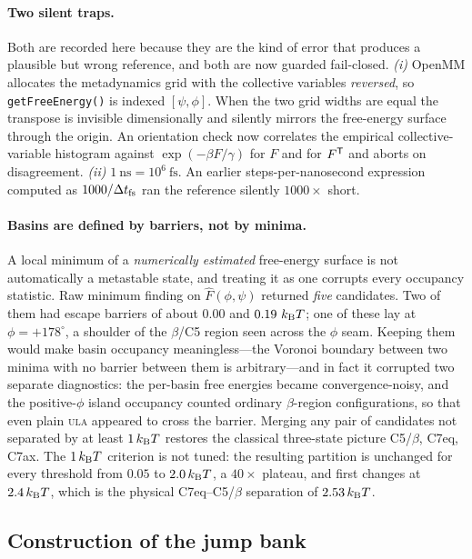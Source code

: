 \documentclass[11pt]{article}
\begin{document}
\paragraph{Two silent traps.}
Both are recorded here because they are the kind of error that produces a
plausible but wrong reference, and both are now guarded fail-closed.
\emph{(i)} OpenMM allocates the metadynamics grid with the collective variables
\emph{reversed}, so \texttt{getFreeEnergy()} is indexed $[\psi,\phi]$.  When the
two grid widths are equal the transpose is invisible dimensionally and silently
mirrors the free-energy surface through the origin.  An orientation check now
correlates the empirical collective-variable histogram against
$\exp(-\beta F/\gamma)$ for $F$ and for $F^{\sf T}$ and aborts on
disagreement.  \emph{(ii)} $1\ \mathrm{ns}=10^{6}\ \mathrm{fs}$.  An earlier
steps-per-nanosecond expression computed as $1000/\Delta t_{\rm fs}$ ran the
reference silently $1000\times$ short.

\paragraph{Basins are defined by barriers, not by minima.}
A local minimum of a \emph{numerically estimated} free-energy surface is not
automatically a metastable state, and treating it as one corrupts every
occupancy statistic.  Raw minimum finding on $\widehat F(\phi,\psi)$ returned
\emph{five} candidates.  Two of them had escape barriers of about $0.00$ and
$0.19\ k_{\rm B}T$; one of these lay at $\phi=+178^\circ$, a shoulder of the
$\beta$/C5 region seen across the $\phi$ seam.  Keeping them would make basin
occupancy meaningless---the Voronoi boundary between two minima with no barrier
between them is arbitrary---and in fact it corrupted two separate diagnostics:
the per-basin free energies became convergence-noisy, and the
positive-$\phi$ island occupancy counted ordinary $\beta$-region
configurations, so that even plain \textsc{ula} appeared to cross the barrier.
Merging any pair of candidates not separated by at least $1\,k_{\rm B}T$
restores the classical three-state picture C5/$\beta$, C7eq, C7ax.  The
$1\,k_{\rm B}T$ criterion is not tuned: the resulting partition is unchanged
for every threshold from $0.05$ to $2.0\,k_{\rm B}T$, a $40\times$ plateau, and
first changes at $2.4\,k_{\rm B}T$, which is the physical C7eq--C5/$\beta$
separation of $2.53\,k_{\rm B}T$.

\subsection{Construction of the jump bank}
\label{app:e5-bank}
\end{document}

